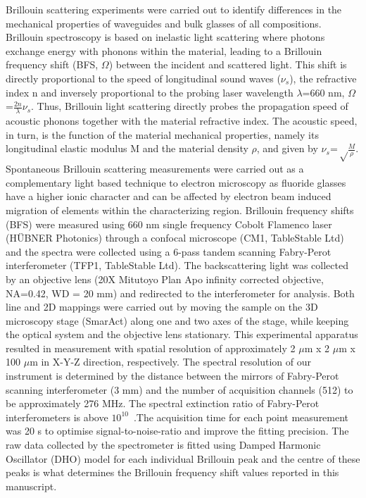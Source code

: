 \documentclass[11pt]{article}
\begin{document}
Brillouin scattering experiments were carried out to identify differences in the mechanical properties of waveguides and bulk glasses of all compositions. Brillouin spectroscopy is based on inelastic light scattering where photons exchange energy with phonons within the material, leading to a Brillouin frequency shift (BFS, $\Omega$) between the incident and scattered light. This shift is directly proportional to the speed of longitudinal sound waves ($\nu_s$), the refractive index n and inversely proportional to the probing laser wavelength $\lambda$=660 nm, $\Omega$=$\frac{2n}{\lambda}\nu_s$. Thus, Brillouin light scattering directly probes the propagation speed of acoustic phonons together with the material refractive index. The acoustic speed, in turn, is the function of the material mechanical properties, namely its longitudinal elastic modulus M and the material density $\rho$, and given by $\nu_s$=$\sqrt \frac{M}{\rho}$.  Spontaneous Brillouin scattering measurements were carried out as a complementary light based technique to electron microscopy as fluoride glasses have a higher ionic character and can be affected by electron beam induced migration of elements within the characterizing region. Brillouin frequency shifts (BFS) were measured using 660 nm single frequency Cobolt Flamenco laser (HÜBNER Photonics) through a confocal microscope (CM1, TableStable Ltd) and the spectra were collected using a 6-pass tandem scanning Fabry-Perot interferometer (TFP1, TableStable Ltd). The backscattering light was collected by an objective lens (20X Mitutoyo Plan Apo infinity corrected objective, NA=0.42, WD = 20 mm) and redirected to the interferometer for analysis. Both line and 2D mappings were carried out by moving the sample on the 3D microscopy stage (SmarAct) along one and two axes of the stage, while keeping the optical system and the objective lens stationary. This experimental apparatus resulted in measurement with spatial resolution of approximately 2 $\mu$m x 2 $\mu$m x 100 $\mu$m in X-Y-Z direction, respectively. The spectral resolution of our instrument is determined by the distance between the mirrors of Fabry-Perot scanning interferometer (3 mm) and the number of acquisition channels (512) to be approximately 276 MHz. The spectral extinction ratio of Fabry-Perot interferometers is above $10^{10}$~\cite{Sandercock1976}.The acquisition time for each point measurement was 20 s to optimise signal-to-noise-ratio and improve the fitting precision. The raw data collected by the spectrometer is fitted using Damped Harmonic Oscillator (DHO) model for each individual Brillouin peak and the centre of these peaks is what determines the Brillouin frequency shift values reported in this manuscript.
\end{document}

